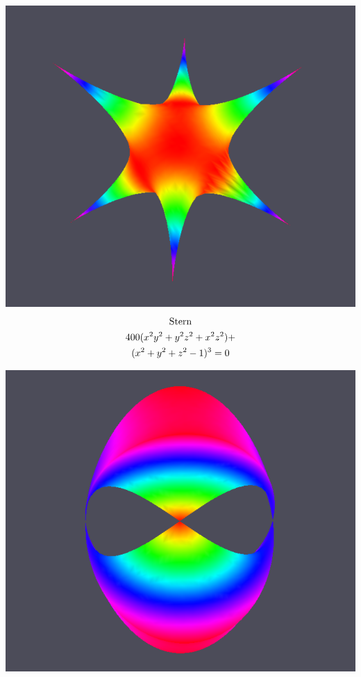 \documentclass[paperwidth=46in, paperheight = 33.11in]{baposter}%
\begin{document}
\begin{poster}
{\begin{center}
\begin{minipage}[t]{0.48\linewidth}
    \begin{center}
        \includegraphics[width=.99\linewidth]{pictures/stern_crop}
        \vspace*{-7mm}
        \begin{gather*}
               \textnormal{Stern}\\
        400(x^2y^2+y^2z^2+x^2z^2)+\\(x^2+y^2+z^2-1)^3=0
        \\
        \end{gather*}
    \end{center}
\end{minipage}
\hspace{0.01\linewidth}
\begin{minipage}[t]{0.48\linewidth}
    \begin{center}
        \includegraphics[width=.99\linewidth]{pictures/crixxi_crop}

\end{center}
\end{minipage}
\end{center}}
\end{poster}
\end{document}
